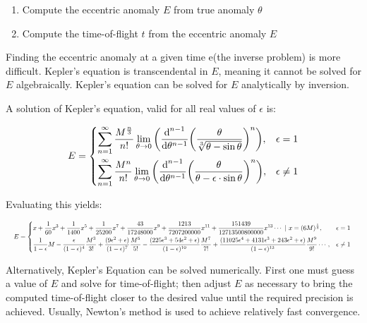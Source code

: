 \documentclass[12pt]{article}
\begin{document}
\begin{enumerate}
  \item Compute the eccentric anomaly \(E\) from true anomaly \(\theta\)
  \item Compute the time-of-flight \(t\) from the eccentric anomaly \(E\)
\end{enumerate}

Finding the eccentric anomaly at a given time e(the inverse problem) is more difficult. Kepler's equation is transcendental in \(E\), meaning it cannot be solved for \(E\) algebraically. Kepler's equation can be solved for \(E\) analytically by inversion.

A solution of Kepler's equation, valid for all real values of \(\epsilon\) is:

\begin{align*}
  E=\begin{dcases}
  \sum\limits_{n=1}^{\infty} {\frac{M^{\frac{n}{3}}}{n!}} \lim\limits_{\theta \to 0} {\left(\frac{\text{d}^{n-1}}{\text{d}\theta^{n-1}} {\left(\frac{\theta}{\sqrt[3]{\theta-\sin\theta}}\right)}^{n}\right)} , & \epsilon = 1 \\
  \sum\limits_{n=1}^{\infty} {\frac{M^{n}}{n!}} \lim\limits_{\theta \to 0} {\left(\frac{\text{d}^{n-1}}{\text{d}\theta^{n-1}} {\left(\frac{\theta}{\theta-\epsilon \cdot \sin \theta}\right)}^{n}\right)} , & \epsilon \ne 1
  \end{dcases}
\end{align*}

Evaluating this yields:

\begin{displaymath}
  \hspace*{-0.0 \textwidth} \resizebox{ 1.0 \textwidth}{!}{$E=\begin{dcases} x + \frac{1}{60} x^3 + \frac{1}{1400} x^5 + \frac{1}{25200} x^7 + \frac{43}{17248000}x^9 + \frac{1213}{7207200000} x^{11} + \frac{151439}{12713500800000} x^{13} \cdots \ | \ x=(6M)^\frac{1}{3} , & \epsilon = 1 \\ \frac{1}{1-\epsilon}M-\frac{\epsilon}{(1-\epsilon)^4}\frac{M^3}{3!} + \frac{(9\epsilon^2+\epsilon)}{(1-\epsilon)^7}\frac{M^5}{5!} - \frac{(225\epsilon^3+54\epsilon^2+\epsilon)}{(1-\epsilon)^{10}}\frac{M^7}{7!} + \frac{(11025\epsilon^4 + 4131\epsilon^3+243\epsilon^2+\epsilon)}{(1-\epsilon)^{13}}\frac{M^9}{9!} \cdots , & \epsilon \ne 1 \end{dcases} $
    }
\end{displaymath}

Alternatively, Kepler's Equation can be solved numerically. First one must guess a value of \(E\) and solve for time-of-flight; then adjust \(E\) as necessary to bring the computed time-of-flight closer to the desired value until the required precision is achieved. Usually, Newton's method is used to achieve relatively fast convergence.
\end{document}

